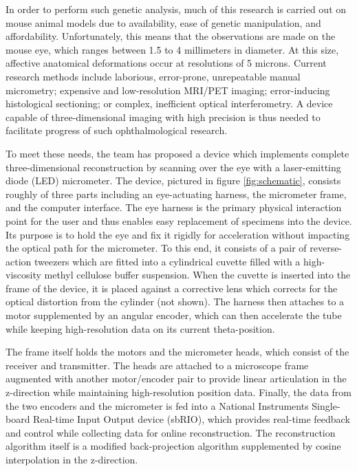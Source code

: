 \documentclass{article}
\begin{document}
In order to perform such genetic analysis, much of this research is carried out on mouse animal models due to availability, ease of genetic manipulation, and affordability\cite{schaeffel04}. Unfortunately, this means that the observations are made on the mouse eye, which ranges between 1.5 to 4 millimeters in diameter. At this size, affective anatomical deformations occur at resolutions of 5 microns. Current research methods include laborious, error-prone, unrepeatable manual micrometry\cite{wallman04}; expensive and low-resolution MRI/PET imaging\cite{atchison04}; error-inducing histological sectioning\cite{schaeffel04}; or complex, inefficient optical interferometry\cite{guggenheim04,schaeffel04}. A device capable of three-dimensional imaging with high precision is thus needed to facilitate progress of such ophthalmological research.
 
To meet these needs, the team has proposed a device which implements complete three-dimensional reconstruction by scanning over the eye with a laser-emitting diode (LED) micrometer. The device, pictured in figure \ref{fig:schematic}, consists roughly of three parts including an eye-actuating harness, the micrometer frame, and the computer interface. The eye harness is the primary physical interaction point for the user and thus enables easy replacement of specimens into the device. Its purpose is to hold the eye and fix it rigidly for acceleration without impacting the optical path for the micrometer. To this end, it consists of a pair of reverse-action tweezers which are fitted into a cylindrical cuvette filled with a high-viscosity methyl cellulose buffer suspension. When the cuvette is inserted into the frame of the device, it is placed against a corrective lens which corrects for the optical distortion from the cylinder (not shown). The harness then attaches to a motor supplemented by an angular encoder, which can then accelerate the tube while keeping high-resolution data on its current theta-position.
 
The frame itself holds the motors and the micrometer heads, which consist of the receiver and transmitter. The heads are attached to a microscope frame augmented with another motor/encoder pair to provide linear articulation in the z-direction while maintaining high-resolution position data. Finally, the data from the two encoders and the micrometer is fed into a National Instruments Single-board Real-time Input Output device (sbRIO), which provides real-time feedback and control while collecting data for online reconstruction. The reconstruction algorithm itself is a modified back-projection algorithm supplemented by cosine interpolation in the z-direction.
 
\end{document}
